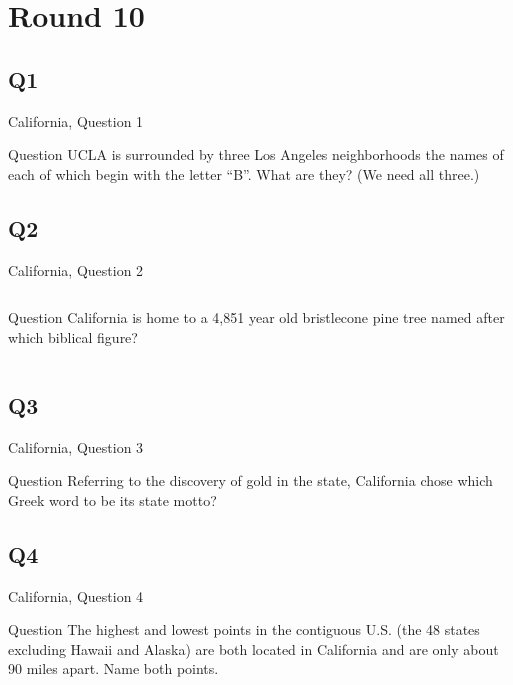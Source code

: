 \documentclass[11pt]{beamer}
\begin{document}
\section{Round 10}
\subsection*{Q1}
\begin{frame}[t]{California, Question 1}
\begin{block}{Question}
UCLA is surrounded by three Los Angeles neighborhoods the names of each of which begin with the letter ``B''.  What are they? (We need all three.)
\end{block}
\end{frame}
\subsection*{Q2}
\begin{frame}[t]{California, Question 2}
\begin{columns}[T,totalwidth=\linewidth]
\begin{column}{0.32\linewidth}
\begin{block}{Question}
California is home to a 4,851 year old bristlecone pine tree named after which biblical figure?
\end{block}
\end{column}
\begin{column}{0.65\linewidth}
\begin{center}
\texttt{[image: \{Images/methuselah]}.jpg}
\end{center}
\end{column}
\end{columns}
\end{frame}
\subsection*{Q3}
\begin{frame}[t]{California, Question 3}
\begin{block}{Question}
Referring to the discovery of gold in the state, California chose which Greek word to be its state motto?
\end{block}
\end{frame}
\subsection*{Q4}
\begin{frame}[t]{California, Question 4}
\begin{block}{Question}
The highest and lowest points in the contiguous U.S. (the 48 states excluding Hawaii and Alaska) are both located in California and are only about 90 miles apart. Name both points.
\end{block}
\end{frame}
\end{document}
